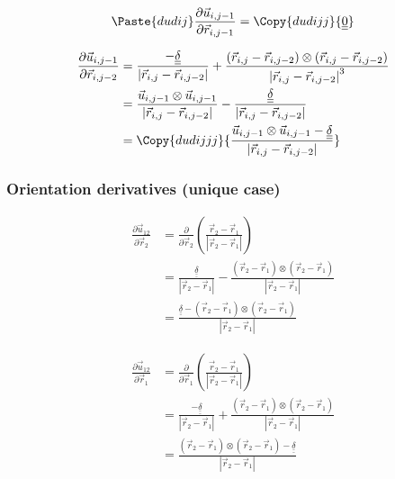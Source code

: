 \documentclass{article}
\renewcommand{\ij}{_{i,j}}
\newcommand{\ijj}{_{i,j-1}}
\newcommand{\ijk}{_{i,j-2}}
\newcommand{\ijjj}{_{i,j-2}}
\newcommand{\magn}[1]{\left\vert #1 \right\vert }
\renewcommand{\part}[2]{\frac{\partial #1 }{\partial #2}}
\newcommand{\partbig}[2]{\frac{\partial }{\partial #2}\left( #1 \right)}
\newcommand{\ten}[1]{\underline{\underline{#1}}}
\newcommand{\rij}{\vec{r} \ij}
\newcommand{\rijjj}{\vec{r} \ijjj}
\newcommand{\rijk}{\vec{r} \ijk}
\newcommand{\uijj}{\vec{u} \ijj}
\begin{document}
\begin{align*}
  \Paste{dudij}
  \part{\vec{u} \ijj }{\vec{r} \ijj} = 
  \Copy{dudijj}{ \ten{0}}
\end{align*}

\begin{align*}
  \part{\vec{u} \ijj }{\vec{r} \ijk} 
  &=
     \frac{-\ten{\delta }}{\magn{\vec{r} \ij - \vec{r} \ijjj}} 
  +
  \frac{
    \left(\rij - \rijk \right)\otimes 
  \left(\rij - \rijk \right)
  }{
    \magn{\rij - \rijjj } ^3
    }
  \\
  & =
  \frac{\uijj \otimes \uijj}{\magn{\rij - \rijjj}}
  -
  \frac{\ten{\delta}}{\magn{\rij - \rijjj}} 
  \\
  &  =
  \Copy{dudijjj}
  {
  \frac{\uijj \otimes \uijj - \ten{\delta} }{\magn{\rij - \rijjj}}
  }
\end{align*}


\subsubsection{Orientation derivatives (unique case)}

\begin{align*}
  \part{\vec{u}_{12}}{\vec{r}_{2}} 
  &=
  \partbig{\frac{\vec{r}_2 - \vec{r}_1}{\magn{\vec{r}_2 - \vec{r}_1}}}
  {\vec{r}_{2}}
  \\
  &=
  \frac{\ten{\delta}}
  {\magn{\vec{r}_{2} - \vec{r}_{1}}} 
  - 
  \frac{(\vec{r}_{2} - \vec{r}_{1} ) 
  \otimes 
  (\vec{r}_{2} - \vec{r}_{1} )
  }
  {\magn{\vec{r}_{2} - \vec{r}_{1}}} \\
  & = 
  \frac{
  \ten{\delta}  
  -
  (\vec{r}_{2} - \vec{r}_{1} ) 
  \otimes 
  (\vec{r}_{2} - \vec{r}_{1} )
  }
  {\magn{\vec{r}_{2} - \vec{r}_{1}}} 
\end{align*}



\begin{align*}
  \part{\vec{u}_{12}}{\vec{r}_{1}} 
  &=
  \partbig{\frac{\vec{r}_2 - \vec{r}_1}{\magn{\vec{r}_2 - \vec{r}_1}}}
  {\vec{r}_{1}}
  \\
  &=
  \frac{-\ten{\delta}}
  {\magn{\vec{r}_{2} - \vec{r}_{1}}} 
  + 
  \frac{(\vec{r}_{2} - \vec{r}_{1} ) 
  \otimes 
  (\vec{r}_{2} - \vec{r}_{1} )
  }
  {\magn{\vec{r}_{2} - \vec{r}_{1}}} \\
  & = 
  \frac{
  (\vec{r}_{2} - \vec{r}_{1} ) 
  \otimes 
  (\vec{r}_{2} - \vec{r}_{1} )
  -
  \ten{\delta}  
  }
  {\magn{\vec{r}_{2} - \vec{r}_{1}}} 
\end{align*}
\end{document}
